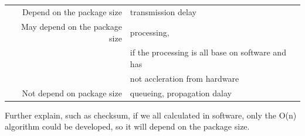 \documentclass{article}
\begin{document}
\subsection{}
\begin{tabular}{|r|l|}
Depend on the package size& transmission delay\\
May depend on the package size& processing, \\
& if the processing is all base on software and has \\
&not accleration from hardware\\
Not depend on package size& {queueing, propagation} dalay\\
\end{tabular}

Further explain, such as checksum, if we all calculated in software, only the O(n) algorithm could be developed, so it will depend on the package size.
\end{document}
